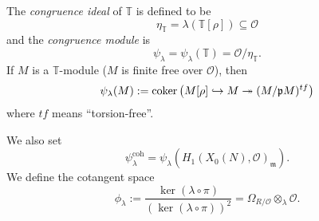 \documentclass[reqno]{amsart} 
\begin{document}
\begin{definition}
  The \emph{congruence ideal} of $\mathbb{T}$ is defined to be
  \begin{equation*}
    \eta_{\mathbb{T}} = \lambda \left( \mathbb{T}[\rho] \right) \subseteq \mathcal{O}
  \end{equation*}
  and the \emph{congruence module} is
  \begin{equation*}
    \psi_\lambda = \psi_\lambda(\mathbb{T}) = \mathcal{O} / \eta_{\mathbb{T}}.
  \end{equation*}
  If $M$ is a $\mathbb{T}$-module ($M$ is finite free over $\mathcal{O}$), then
  \begin{equation*}
    \psi_\lambda(M) := \operatorname{coker} \left( M[\rho] \hookrightarrow M \twoheadrightarrow(M / \mathfrak{p} M)^{t f} \right)
  \end{equation*}
  where $t f$ means ``torsion-free''.
\end{definition}
We also set
\begin{equation*}
  \psi_\lambda^{\mathrm{coh}} = \psi_\lambda(H_1(X_0(N), \mathcal{O})_{\mathfrak{m}}).
\end{equation*}
We define the cotangent space
\begin{equation*}
  \phi_\lambda :=
  \frac{\ker(\lambda \circ \pi)}{\left( \ker(\lambda \circ \pi) \right)^2 }
  = \Omega_{R / \mathcal{O}} \otimes_\lambda \mathcal{O}.
\end{equation*}
\end{document}
